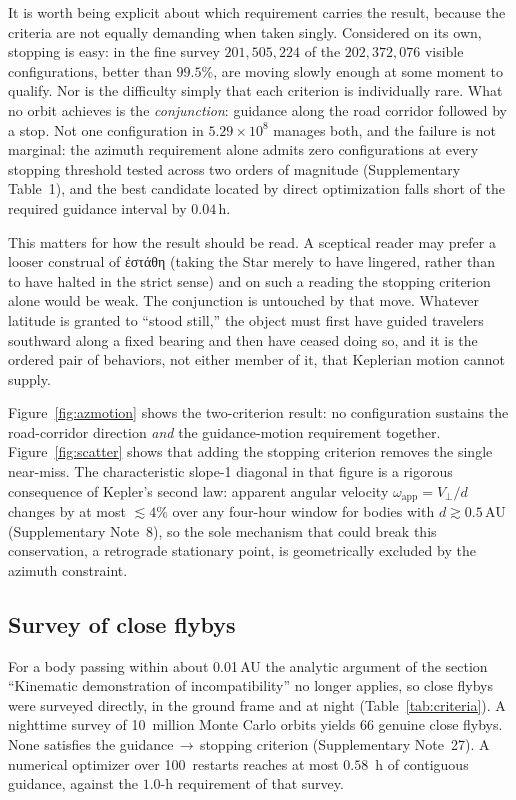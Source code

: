 \documentclass[sn-nature]{sn-jnl}
\newcommand{\grk}[1]{{\fontencoding{LGR}\selectfont #1}}
\newcommand{\grk}[1]{{\greekfont #1}}
\begin{document}
It is worth being explicit about which requirement carries the result, because
the criteria are not equally demanding when taken singly.  Considered on its
own, stopping is easy: in the fine survey $201{,}505{,}224$ of the
$202{,}372{,}076$ visible configurations, better than $99.5\%$, are moving
slowly enough at some moment to qualify.  Nor is the difficulty simply that
each criterion is individually rare.  What no orbit achieves is the
\emph{conjunction}: guidance along the road corridor followed by a stop.
Not one configuration in $5.29\times10^{8}$ manages both, and the failure is
not marginal: the azimuth requirement alone admits zero configurations at
every stopping threshold tested across two orders of magnitude
(Supplementary Table~1), and the best candidate located by direct
optimization falls short of the required guidance interval by $0.04$\,h.

This matters for how the result should be read.  A sceptical reader may prefer
a looser construal of \grk{ἐστάθη} (taking the Star merely to have lingered,
rather than to have halted in the strict sense) and on such a reading the
stopping criterion alone would be weak.  The conjunction is untouched by that
move.  Whatever latitude is granted to ``stood still,'' the object must first
have guided travelers southward along a fixed bearing and then have ceased
doing so, and it is the ordered pair of behaviors, not either member of it,
that Keplerian motion cannot supply.

Figure~\ref{fig:azmotion} shows the two-criterion result:
no configuration sustains the road-corridor direction \emph{and} the
guidance-motion requirement together. Figure~\ref{fig:scatter} shows that
adding the stopping criterion removes the single near-miss. The characteristic
slope-1 diagonal in that figure is a rigorous consequence of Kepler's second
law: apparent angular velocity $\omega_\mathrm{app} = V_\perp/d$ changes by at
most $\lesssim\!4\%$ over any four-hour window for bodies with
$d \gtrsim 0.5$\,AU (Supplementary Note~8), so the sole mechanism that could
break this conservation, a retrograde stationary point, is geometrically
excluded by the azimuth constraint.

\subsection{Survey of close flybys}\label{subsec:flyby}

For a body passing within about 0.01\,AU the analytic argument of
the section ``Kinematic demonstration of incompatibility'' no longer applies, so close flybys were surveyed
directly, in the ground frame and at night (Table~\ref{tab:criteria}).
A nighttime survey of 10~million Monte Carlo orbits yields 66 genuine close
flybys. None satisfies the guidance\,$\to$\,stopping criterion
(Supplementary Note~27). A numerical optimizer over
100~restarts reaches at most $0.58$~h of contiguous guidance, against the
$1.0$-h requirement of that survey.
\end{document}
